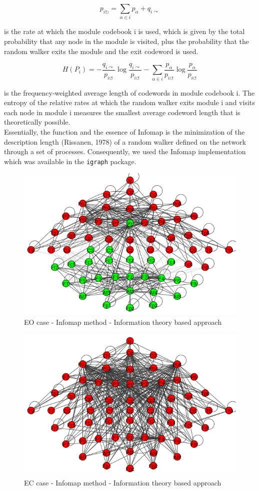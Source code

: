 \documentclass[%
 aip,
 jmp,%
 amsmath,amssymb,
 reprint,%
]{revtex4-1}
\begin{document}
\[ 	p_{i \circlearrowright} = \sum_{\alpha \in i} p_{\alpha} + q_{i \curvearrowright}  \]

is the rate at which the module codebook i is used, which is given by the total
probability that any node in the module is visited, plus the probability that the
random walker exits the module and the exit codeword is used.

	\[ H(P_i) = - \frac{ q_{i \curvearrowright} } { p_{i \circlearrowleft} } \log \frac{q_{i \curvearrowright}}{  p_{i \circlearrowleft} }- \sum_{\alpha \in i} \frac{ p_{\alpha }}{ p_{i \circlearrowleft} } \log \frac{ p_{\alpha}}{ p_{i \circlearrowleft} } \]

is the frequency-weighted average length of codewords in module codebook i. The
entropy of the relative rates at which the random walker exits module i and visits
each node in module i measures the smallest average codeword length that
is theoretically possible.\\

Essentially, the function and the essence of Infomap  is the minimization of the description length (Rissanen, 1978) of a random walker defined on the network through a set of processes. Consequently, we used the Infomap implementation which was available in the \verb|igraph| package.

\begin{figure}
	\centering
	\includegraphics[width=0.7\linewidth]{../infoTheo_open}
	\caption{EO case - Infomap method - Information theory based approach}
	\label{fig:infotheoopen}
\end{figure}

\begin{figure}
	\centering
	\includegraphics[width=0.7\linewidth]{../infoTheo_closed}
	\caption{EC case - Infomap method - Information theory based approach}
	\label{fig:infotheoclosed}
\end{figure}
\end{document}
